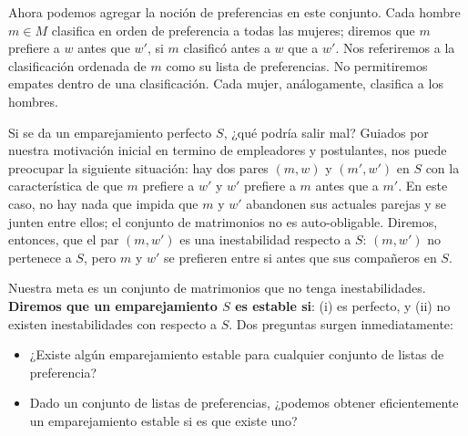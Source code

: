 \documentclass[a4paper, 12pt]{book}
\theoremstyle{dotless}
\begin{document}
Ahora podemos agregar la noción de preferencias en este conjunto. Cada hombre $m \in M$  clasifica en orden de preferencia a todas las mujeres; diremos que $m$ prefiere a $w$ antes que $w'$, si $m$ clasificó antes a $w$ que a $w'$. Nos referiremos a la clasificación ordenada de $m$ como su lista de preferencias. No permitiremos empates dentro de una clasificación. Cada mujer, análogamente, clasifica a los hombres. 

Si se da un emparejamiento perfecto $S$, ¿qué podría salir mal? Guiados por nuestra motivación inicial en termino de empleadores y postulantes, nos puede preocupar la siguiente situación: hay dos pares $(m, w)$ y $(m', w')$ en $S$ con la característica de que $m$ prefiere a $w'$ y $w'$ prefiere a $m$ antes que a $m'$. En este caso, no hay nada que impida que $m$ y $w'$ abandonen sus actuales parejas y se junten entre ellos; el conjunto de matrimonios no es auto-obligable. Diremos, entonces, que el par $(m,w')$ es una inestabilidad respecto a $S$: $(m,w')$ no pertenece a $S$, pero $m$ y $w'$ se prefieren entre si antes que sus compañeros en $S$. 
   
Nuestra meta es un conjunto de matrimonios que no tenga inestabilidades. \textbf{Diremos que un emparejamiento $S$ es estable si}: (i) es perfecto, y (ii) no existen inestabilidades con respecto a $S$. Dos preguntas surgen inmediatamente:

\begin{itemize}
    \item ¿Existe algún emparejamiento estable para cualquier conjunto de listas de preferencia?
    \item Dado un conjunto de listas de preferencias, ¿podemos obtener eficientemente un emparejamiento estable si es que existe uno? 
\end{itemize}

\end{document}
